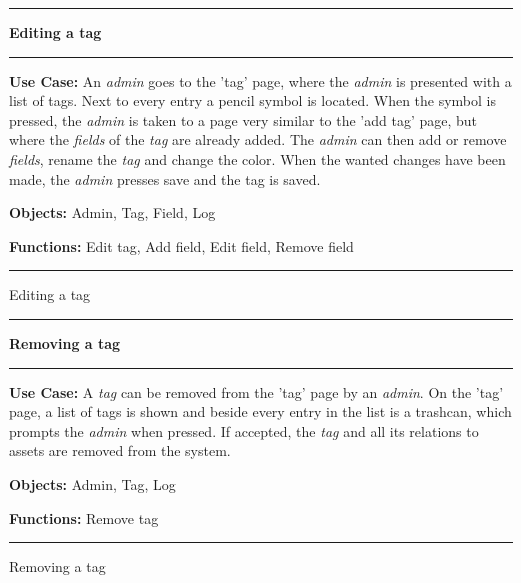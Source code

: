 
\begin{use_case}[H]
    \hrule
    \vskip 0.3cm
    \Large
    \begin{center}
    
        \textbf{Editing a tag}
        
    \end{center}
    \vskip 0.1cm
    \hrule
    \vskip 0.2cm
    \normalsize
    
    \textbf{Use Case:} An \textit{admin} goes to the 'tag' page, where the \textit{admin} is presented with a list of tags. Next to every entry a pencil symbol is located. When the symbol is pressed, the \textit{admin} is taken to a page very similar to the 'add tag' page, but where the \textit{fields} of the \textit{tag} are already added. The \textit{admin} can then add or remove \textit{fields}, rename the \textit{tag} and change the color. When the wanted changes have been made, the \textit{admin} presses save and the tag is saved.
    
    \vskip 0.2cm
    
    \textbf{Objects:} Admin, Tag, Field, Log
    
    \vskip 0.2cm
    
    \textbf{Functions:} Edit tag, Add field, Edit field, Remove field
    
    \vskip 0.4cm
    \hrule
    \vskip 0.2cm
    \caption{Editing a tag} \label{use_case:editing_a_tag}
\end{use_case}


\begin{use_case}[H]
    \hrule
    \vskip 0.3cm
    \Large
    \begin{center}
    
        \textbf{Removing a tag}
        
    \end{center}
    \vskip 0.1cm
    \hrule
    \vskip 0.2cm
    \normalsize
    
    \textbf{Use Case:} A \textit{tag} can be removed from the 'tag' page by an \textit{admin}. On the 'tag' page, a list of tags is shown and beside every entry in the list is a trashcan, which prompts the \textit{admin} when pressed. If accepted, the \textit{tag} and all its relations to assets are removed from the system.
    
    \vskip 0.2cm
    
    \textbf{Objects:} Admin, Tag, Log
    
    \vskip 0.2cm
    
    \textbf{Functions:} Remove tag
    
    \vskip 0.4cm
    \hrule
    \vskip 0.2cm
    \caption{Removing a tag} \label{use_case:removing_a_tag}
\end{use_case}


